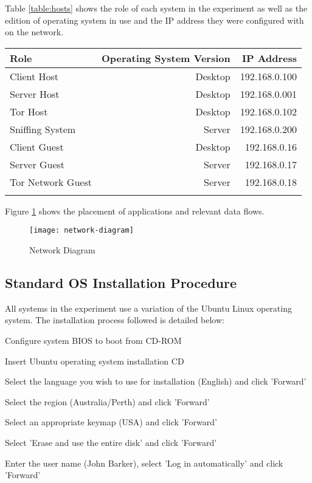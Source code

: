 Table \ref{table:hosts} shows the role of each system in the experiment as well
as the edition of operating system in use and the IP address they were
configured with on the network.

\begin{tabular}{lrr}
  \toprule
  Role & Operating System Version & IP Address\\
  \midrule
  Client Host & Desktop & 192.168.0.100\\
  Server Host & Desktop & 192.168.0.001\\
  Tor Host & Desktop & 192.168.0.102\\
  \midrule
  Sniffing System & Server & 192.168.0.200\\
  \midrule
  Client Guest & Desktop & 192.168.0.16\\
  Server Guest & Server & 192.168.0.17\\
  Tor Network Guest & Server & 192.168.0.18\\
  \bottomrule
  \label{table:hosts}
\end{tabular}

Figure \ref{network-diagram} shows the placement of applications and relevant
data flows.

\begin{figure}[H]
  \centering\texttt{[image: network-diagram]}
  \caption{Network Diagram}
  \label{network-diagram}
\end{figure}

\subsection{Standard OS Installation Procedure}
\label{section:os_install}

All systems in the experiment use a variation of the Ubuntu Linux operating
system. The installation process followed is detailed below:

\begin{enumerate*}
  \item Configure system BIOS to boot from CD-ROM
  \item Insert Ubuntu operating system installation CD
  \item Select the language you wish to use for installation (English) and click
    'Forward'
  \item Select the region (Australia/Perth) and click 'Forward'
  \item Select an appropriate keymap (USA) and click 'Forward'
  \item Select 'Erase and use the entire disk' and click 'Forward'
  \item Enter the user name (John Barker), select 'Log in automatically' and click 'Forward'
\end{enumerate*}

